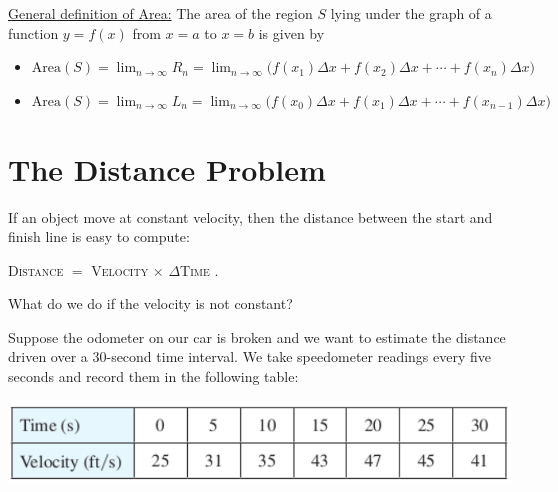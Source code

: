 \documentclass[12pt,a4paper]{article}
\newcommand{\ra}{\rightarrow}
\newcounter{example}[section]
\begin{document}
	\vfill
	
	\underline{General definition of Area:} The area of the region $S$ lying under the graph of a function $y = f(x)$ from $x = a$ to $x = b$ is given by
		\begin{itemize}
		\item $\mathrm{Area} (S) = \displaystyle\lim_{n \ra \infty} R_n =  \lim_{n \ra \infty} \Big( f(x_1) \Delta x + f(x_2) \Delta x + \cdots + f(x_n) \Delta x \Big)$ 
		\item $\mathrm{Area} (S) = \displaystyle\lim_{n \ra \infty} L_n = \lim_{n \ra \infty} \Big( f(x_0) \Delta x + f(x_1) \Delta x + \cdots + f(x_{n-1}) \Delta x \Big)$
		\end{itemize}
		
	\newpage
	
	\section{The Distance Problem}
	
	If an object move at constant velocity, then the distance between the start and finish line is easy to compute:
		\begin{center}
		\textsc{Distance} $=$ \textsc{Velocity} $\times$ $\Delta$\textsc{Time} .
		\end{center}
		
	What do we do if the velocity is not constant?
	
	\vspace*{12pt}
	
	\begin{example}
	Suppose the odometer on our car is broken and we want to estimate the distance driven over a $30$-second time interval. We take speedometer readings every five seconds and record them in the following table:
		\begin{center}
		\includegraphics[scale=0.5]{tableVelocities.png}
		\end{center}
	\end{example}
	
	\vspace*{0.5cm}
	
\end{document}
